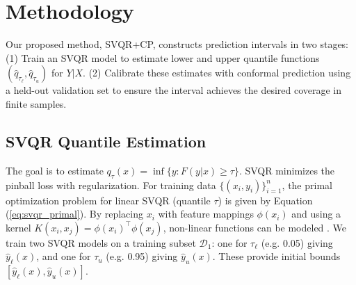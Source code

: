 \documentclass{article}
\begin{document}
\section{Methodology}
Our proposed method, SVQR+CP, constructs prediction intervals in two stages: (1) Train an SVQR model to estimate lower and upper quantile functions $(\hat{q}_{\tau_{\ell}}, \hat{q}_{\tau_{u}})$ for $Y|X$. (2) Calibrate these estimates with conformal prediction using a held-out validation set to ensure the interval achieves the desired coverage in finite samples.

\subsection{SVQR Quantile Estimation}
The goal is to estimate $q_{\tau}(x) = \inf\{y: F(y|x) \ge \tau\}$. SVQR minimizes the pinball loss with regularization. For training data $\{(x_i, y_i)\}_{i=1}^n$, the primal optimization problem for linear SVQR (quantile $\tau$) is given by Equation (\ref{eq:svqr_primal}).
By replacing $x_i$ with feature mappings $\phi(x_i)$ and using a kernel $K(x_i, x_j) = \phi(x_i)^\top \phi(x_j)$, non-linear functions can be modeled \citep{Takeuchi2006NonparametricQE}.
We train two SVQR models on a training subset $\mathcal{D}_1$: one for $\tau_{\ell}$ (e.g. 0.05) giving $\hat{y}_{\ell}(x)$, and one for $\tau_{u}$ (e.g. 0.95) giving $\hat{y}_{u}(x)$. These provide initial bounds $[\hat{y}_{\ell}(x), \hat{y}_{u}(x)]$.
\end{document}
